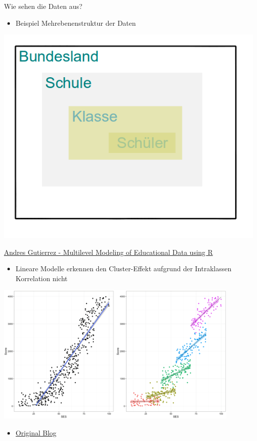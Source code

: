 \documentclass[ignorenonframetext,]{beamer}
\providecommand{\tightlist}{%
\setlength{\itemsep}{0pt}\setlength{\parskip}{0pt}}
\begin{document}
\begin{frame}{Wie sehen die Daten aus?}

\begin{itemize}
\tightlist
\item
  Beispiel Mehrebenenstruktur der Daten
\end{itemize}

\includegraphics{./tex2pdf.956/4786156521501da76e0a51cf5994ecce9933ddb2.png}

\end{frame}

\begin{frame}{\href{https://www.r-bloggers.com/multilevel-modeling-of-educational-data-using-r-part-1/}{Andres
Gutierrez - Multilevel Modeling of Educational Data using R}}

\begin{itemize}
\tightlist
\item
  Lineare Modelle erkennen den Cluster-Effekt aufgrund der Intraklassen
  Korrelation nicht
\end{itemize}

\includegraphics{./tex2pdf.956/5efcbb58de37ba05260cc6662c0f6bca20a5ce63.png}

\begin{itemize}
\tightlist
\item
  \href{http://hagutierrezro.blogspot.de/2016/10/multilevel-modeling-of-educational-data.html}{Original
  Blog}
\end{itemize}

\end{frame}
\end{document}

